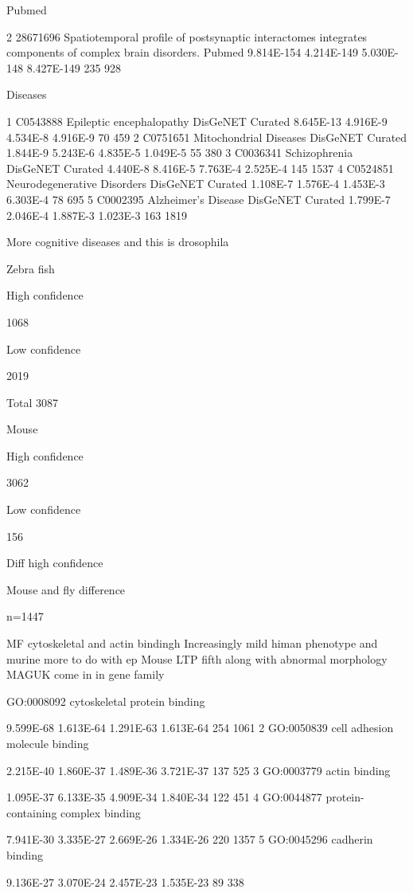 Pubmed

2 
28671696 
Spatiotemporal profile of postsynaptic interactomes integrates components of complex brain disorders. 
Pubmed 
9.814E-154 
4.214E-149 
5.030E-148 
8.427E-149 
235 
928


Diseases


1 
C0543888 
Epileptic encephalopathy 
DisGeNET Curated 
8.645E-13 
4.916E-9 
4.534E-8 
4.916E-9 
70 
459 
2 
C0751651 
Mitochondrial Diseases 
DisGeNET Curated 
1.844E-9 
5.243E-6 
4.835E-5 
1.049E-5 
55 
380 
3 
C0036341 
Schizophrenia 
DisGeNET Curated 
4.440E-8 
8.416E-5 
7.763E-4 
2.525E-4 
145 
1537 
4 
C0524851 
Neurodegenerative Disorders 
DisGeNET Curated 
1.108E-7 
1.576E-4 
1.453E-3 
6.303E-4 
78 
695 
5 
C0002395 
Alzheimer's Disease 
DisGeNET Curated 
1.799E-7 
2.046E-4 
1.887E-3 
1.023E-3 
163 
1819


More cognitive diseases and this is drosophila

Zebra fish

High confidence

1068

Low confidence

2019

Total 3087


Mouse

High confidence 

3062

Low confidence

156

Diff high confidence

Mouse and fly difference

n=1447

MF cytoskeletal and actin bindingh
Increasingly mild himan phenotype and murine more to do with ep
Mouse LTP fifth along with abnormal morphology
MAGUK come in in gene family




GO:0008092 
cytoskeletal protein binding 

9.599E-68 
1.613E-64 
1.291E-63 
1.613E-64 
254 
1061 
2 
GO:0050839 
cell adhesion molecule binding 

2.215E-40 
1.860E-37 
1.489E-36 
3.721E-37 
137 
525 
3 
GO:0003779 
actin binding 

1.095E-37 
6.133E-35 
4.909E-34 
1.840E-34 
122 
451 
4 
GO:0044877 
protein-containing complex binding 

7.941E-30 
3.335E-27 
2.669E-26 
1.334E-26 
220 
1357 
5 
GO:0045296 
cadherin binding 

9.136E-27 
3.070E-24 
2.457E-23 
1.535E-23 
89 
338

